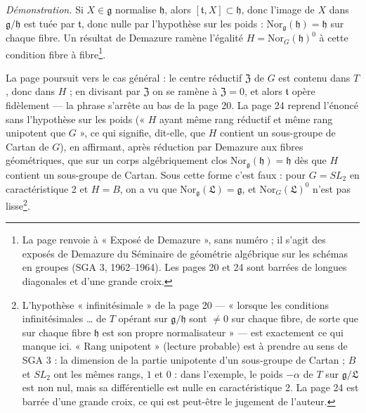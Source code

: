 \documentclass[11pt,a4paper]{article}
\begin{document}
\emph{Démonstration.} Si $X \in \mathfrak{g}$ normalise $\mathfrak{h}$, alors
$[\mathfrak{t}, X] \subset \mathfrak{h}$, donc l'image de $X$ dans
$\mathfrak{g}/\mathfrak{h}$ est tuée par $\mathfrak{t}$, donc nulle par
l'hypothèse sur les poids : $\mathrm{Nor}_{\mathfrak{g}}(\mathfrak{h}) = \mathfrak{h}$
sur chaque fibre. Un résultat de Demazure ramène l'égalité
$H = \mathrm{Nor}_G(\mathfrak{h})^0$ à cette condition fibre à fibre\footnote{La
page renvoie à « Exposé de Demazure », sans numéro ; il s'agit des
exposés de Demazure du Séminaire de géométrie algébrique sur les schémas en
groupes (SGA 3, 1962--1964). Les pages 20 et 24 sont barrées de longues
diagonales et d'une grande croix.}.

La page poursuit vers le cas général : le centre réductif $\mathfrak{Z}$ de $G$
est contenu dans $T$, donc dans $H$ ; en divisant par $\mathfrak{Z}$ on se ramène
à $\mathfrak{Z} = 0$, et alors $\mathfrak{t}$ opère fidèlement — la phrase s'arrête
au bas de la page 20. La page 24 reprend l'énoncé sans l'hypothèse sur les
poids (« $H$ ayant même rang réductif et même rang unipotent que $G$ », ce qui
signifie, dit-elle, que $H$ contient un sous-groupe de Cartan de $G$), en
affirmant, après réduction par Demazure aux fibres géométriques, que sur un
corps algébriquement clos $\mathrm{Nor}_{\mathfrak{g}}(\mathfrak{h}) = \mathfrak{h}$
dès que $H$ contient un sous-groupe de Cartan. Sous cette forme c'est faux : pour
$G = SL_2$ en caractéristique 2 et $H = B$, on a vu que
$\mathrm{Nor}_{\mathfrak{g}}(\mathfrak{L}) = \mathfrak{g}$, et
$\mathrm{Nor}_G(\mathfrak{L})^0$ n'est pas lisse\footnote{L'hypothèse
« infinitésimale » de la page 20 — « lorsque les conditions infinitésimales
\ldots{} de $T$ opérant sur $\mathfrak{g}/\mathfrak{h}$ sont $\neq 0$ sur chaque
fibre, de sorte que sur chaque fibre $\mathfrak{h}$ est son propre
normalisateur » — est exactement ce qui manque ici. « Rang unipotent » (lecture
probable) est à prendre au sens de SGA 3 : la dimension de la partie unipotente
d'un sous-groupe de Cartan ; $B$ et $SL_2$ ont les mêmes rangs, $1$ et $0$ : dans l'exemple, le poids $-\alpha$ de $T$ sur
$\mathfrak{g}/\mathfrak{L}$ est non nul, mais sa différentielle est nulle en
caractéristique 2. La page 24 est barrée d'une grande croix, ce qui est peut-être
le jugement de l'auteur.}.
\end{document}
